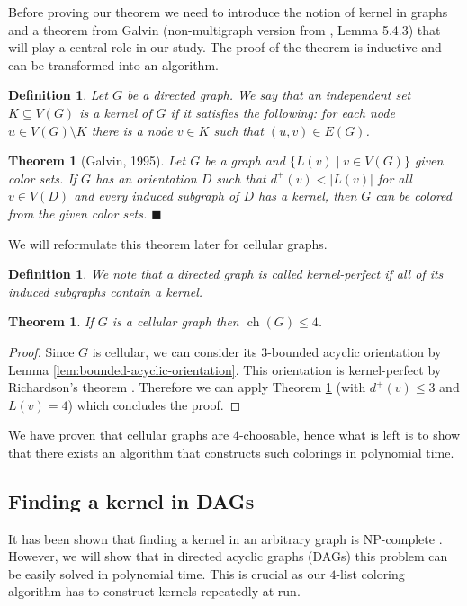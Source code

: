 \documentclass[a4paper, 12pt]{article}
\newtheorem{theo}[lem]{Theorem}
\newtheorem{defin}[lem]{Definition}
\DeclareMathOperator*{\ch}{ch}
\begin{document}
Before proving our theorem we need to introduce the notion of kernel in graphs and a theorem from Galvin \cite{Galvin:1995:LCI:199352.199369} (non-multigraph version from \cite{citeulike:395714}, Lemma 5.4.3) that will play a central role in our study. The proof of the theorem is inductive and can be transformed into an algorithm.
\begin{defin} Let $G$ be a directed graph. We say that an independent set $K \subseteq V(G)$ is a kernel of $G$ if it satisfies the following: for each node $u \in V(G) \setminus K$ there is a node $v \in K$ such that $(u,v) \in E(G)$.
\end{defin}
\begin{theo}[Galvin, 1995]\label{thm:galvin} Let $G$ be a graph and $\lbrace L(v) \mid v \in V(G) \rbrace$ given color sets. If $G$ has an orientation $D$ such that $d^+(v) < |L(v)|$ for all $v \in V(D)$ and every induced subgraph of $D$ has a kernel, then $G$ can be colored from the given color sets. $\blacksquare$
\end{theo}
We will reformulate this theorem later for cellular graphs. 
\begin{defin} We note that a directed graph is called kernel-perfect if all of its induced subgraphs contain a kernel.
\end{defin}
\begin{theo}\label{thm:choice-number}
If $G$ is a cellular graph then $\ch(G) \leqslant 4$.
\end{theo}
\begin{proof}
Since $G$ is cellular, we can consider its $3$-bounded acyclic orientation by Lemma \ref{lem:bounded-acyclic-orientation}. This orientation is kernel-perfect by Richardson's theorem \cite{richardson1946}. Therefore we can apply Theorem \ref{thm:galvin} (with $d^+(v) \leqslant 3$ and $L(v)=4$) which concludes the proof.
\end{proof}

We have proven that cellular graphs are $4$-choosable, hence what is left is to show that there exists an algorithm that constructs such colorings in polynomial time.
\subsection{Finding a kernel in DAGs}\label{sec:dag}

It has been shown that finding a kernel in an arbitrary graph is $\mathrm{NP}$-complete \cite{chvatal}. However, we will show that in directed acyclic graphs (DAGs) this problem can be easily solved in polynomial time. This is crucial as our $4$-list coloring algorithm has to construct kernels repeatedly at run.
\end{document}
